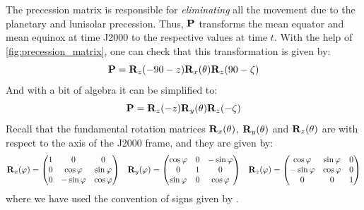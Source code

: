\documentclass[../main.tex]{subfiles}
\begin{document}
The precession matrix is responsible for \emph{eliminating} all the movement due to the planetary and lunisolar precession. Thus, $\boldsymbol{\mathrm{P}}$ transforms the mean equator and mean equinox at time J2000 to the respective values at time $t$. With the help of \cref{fig:precession_matrix}, one can check that this transformation is given by:
\begin{equation}
  \boldsymbol{\mathrm{P}}=\boldsymbol{\mathrm{R}}_z(-90-z)\boldsymbol{\mathrm{R}}_x(\theta)\boldsymbol{\mathrm{R}}_z(90-\zeta)
\end{equation}
And with a bit of algebra it can be simplified to:
\begin{equation}
  \boldsymbol{\mathrm{P}}=\boldsymbol{\mathrm{R}}_z(-z)\boldsymbol{\mathrm{R}}_y(\theta)\boldsymbol{\mathrm{R}}_z(-\zeta)
\end{equation}
Recall that the fundamental rotation matrices $\boldsymbol{\mathrm{R}}_x(\theta)$, $\boldsymbol{\mathrm{R}}_y(\theta)$ and $\boldsymbol{\mathrm{R}}_z(\theta)$ are with respect to the axis of the J2000 frame, and they are given by:
\begin{equation}
  \boldsymbol{\mathrm{R}}_x(\varphi)=\begin{pmatrix}
    1 & 0            & 0           \\
    0 & \cos\varphi  & \sin\varphi \\
    0 & -\sin\varphi & \cos\varphi
  \end{pmatrix}\;\;\;
  \boldsymbol{\mathrm{R}}_y(\varphi)=\begin{pmatrix}
    \cos\varphi & 0 & -\sin\varphi \\
    0           & 1 & 0            \\
    \sin\varphi & 0 & \cos\varphi
  \end{pmatrix}\;\;\;
  \boldsymbol{\mathrm{R}}_z(\varphi)=\begin{pmatrix}
    \cos\varphi  & \sin\varphi & 0 \\
    -\sin\varphi & \cos\varphi & 0 \\
    0            & 0           & 1
  \end{pmatrix}
\end{equation}
where we have used the convention of signs given by \cite{goldstein}.
\end{document}
